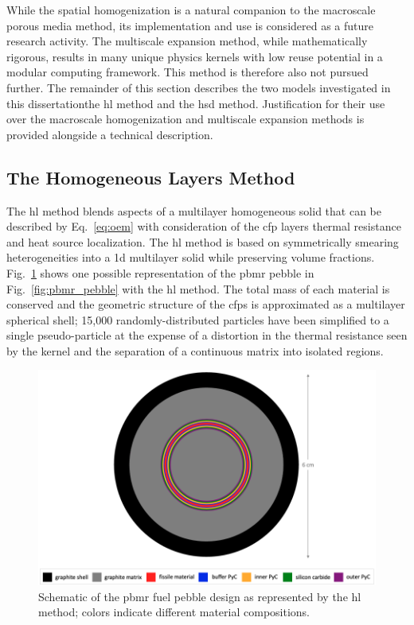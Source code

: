While the spatial homogenization is a natural companion to the macroscale porous media method, its implementation and use is considered as a future research activity. The multiscale expansion method, while mathematically rigorous, results in many unique physics kernels with low reuse potential in a modular computing framework. This method is therefore also not pursued further. The remainder of this section describes the two models investigated in this dissertation\mdash the \gls{hl} method and the \gls{hsd} method. Justification for their use over the macroscale homogenization and multiscale expansion methods is provided alongside a technical description.

\subsection{The Homogeneous Layers Method}

The \gls{hl} method blends aspects of a multilayer homogeneous solid that can be described by Eq.\ \eqref{eq:oem} with consideration of the \gls{cfp} layers thermal resistance and heat source localization. The \gls{hl} method is based on symmetrically smearing heterogeneities into a \gls{1d} multilayer solid while preserving volume fractions. Fig.\ \ref{fig:pbmr_hlm} shows one possible representation of the \gls{pbmr} pebble in Fig.\ \ref{fig:pbmr_pebble} with the \gls{hl} method. The total mass of each material is conserved and the geometric structure of the \glspl{cfp} is approximated as a multilayer spherical shell; 15,000 randomly-distributed particles have been simplified to a single pseudo-particle at the expense of a distortion in the thermal resistance seen by the kernel and the separation of a continuous matrix into isolated regions.

\begin{figure}[!h]
\centering
  \includegraphics[width=0.85\linewidth]{figs/pbmr_hlm.png}
\caption{Schematic of the \gls{pbmr} fuel pebble design as represented by the \gls{hl} method; colors indicate different material compositions.}
\label{fig:pbmr_hlm}
\end{figure}

